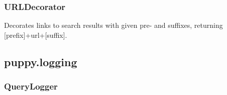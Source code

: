 \documentclass[letterpaper,10pt,english]{sphinxmanual}
\begin{document}
\subsubsection{URLDecorator}
\label{api3.0:urldecorator}

\begin{fulllineitems}
\label{api3.0:puppy.result.modifier.URLDecorator}
Decorates links to search results with given pre- and suffixes, returning {[}prefix{]}+url+{[}suffix{]}.

\end{fulllineitems}



\subsection{puppy.logging}
\label{api3.0:module-puppy.logging}\label{api3.0:puppy-logging}

\subsubsection{QueryLogger}
\label{api3.0:querylogger}
\end{document}
